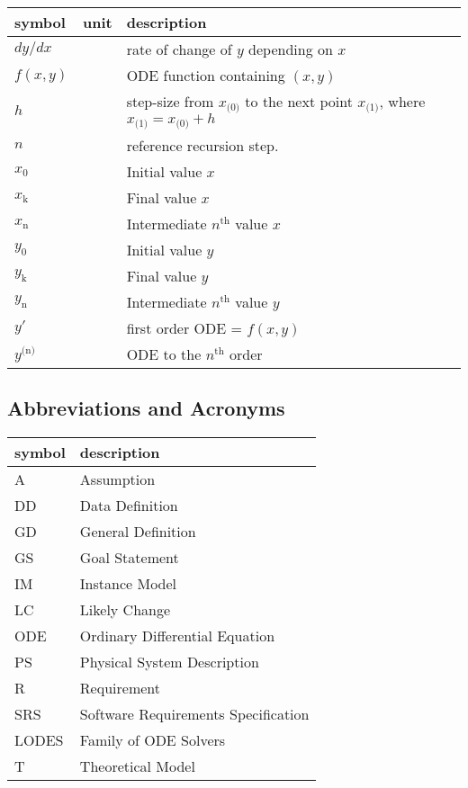 \documentclass[12pt]{article}
\newcommand{\progname}{LODES} %
\newcommand{\progdesc}{Family of ODE Solvers}
\begin{document}
\renewcommand{\arraystretch}{1.2}
\noindent \begin{longtable*}{l l p{12cm}} \toprule
\textbf{symbol} & \textbf{unit} & \textbf{description}\\
\midrule
$dy/dx$ & \text {-} & rate of change of $y$ depending on $x$\\
$f(x, y)$ & \text{-} & ODE function containing $(x,y)$\\
$h$ & \text{-} & step-size from $x_\text{(0)}$ to the next point $x_\text{(1)}$, where $x_\text{(1)} = x_\text{(0)} + h$\\
$n$ & \text{-} & reference recursion step.\\
$x_\text{0}$ & \text{-} & Initial value $x$\\
$x_\text{k}$ & \text{-} & Final value $x$\\
$x_\text{n}$ & \text{-} & Intermediate $n^\text{th}$ value $x$\\
$y_\text{0}$ & \text{-} & Initial value $y$\\ 
$y_\text{k}$ & \text{-} & Final value $y$\\
$y_\text{n}$ & \text{-} & Intermediate $n^\text{th}$ value $y$\\ 
$y'$ & \text{-} & first order ODE = $f(x, y)$\\
$y^\text{(n)}$ & \text{-} & ODE to the $n^\text{th}$ order\\
\bottomrule
\end{longtable*}

\subsection{Abbreviations and Acronyms}

\renewcommand{\arraystretch}{1.2}
\begin{tabular}{l l} 
  \toprule		
  \textbf{symbol} & \textbf{description}\\
  \midrule 
  A & Assumption\\

  DD & Data Definition\\
  GD & General Definition\\
  GS & Goal Statement\\
  IM & Instance Model\\
  LC & Likely Change\\
  ODE & Ordinary Differential Equation\\
  PS & Physical System Description\\
  R & Requirement\\
  SRS & Software Requirements Specification\\
  \progname{} & \progdesc{}\\
  T & Theoretical Model\\
  \bottomrule
\end{tabular}\\
\end{document}
